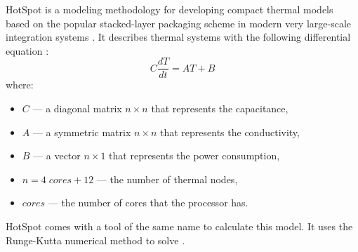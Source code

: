 HotSpot is a modeling methodology for developing compact thermal models based on the popular stacked-layer packaging scheme in modern very large-scale integration systems \cite{huang2006}. It describes thermal systems with the following differential equation \cite{rao2008}:
\begin{equation} \label{eq:initial}
  C \frac{dT}{dt} = AT + B
\end{equation}
where:
\begin{itemize}
  \item $C$ --- a diagonal matrix $n \times n$ that represents the capacitance,
  \item $A$ --- a symmetric matrix $n \times n$ that represents the conductivity,
  \item $B$ --- a vector $n \times 1$ that represents the power consumption,
  \item $n = 4 \; cores + 12$ --- the number of thermal nodes,
  \item $cores$ --- the number of cores that the processor has.
\end{itemize}


HotSpot comes with a tool of the same name to calculate this model. It uses the Runge-Kutta numerical method to solve .

